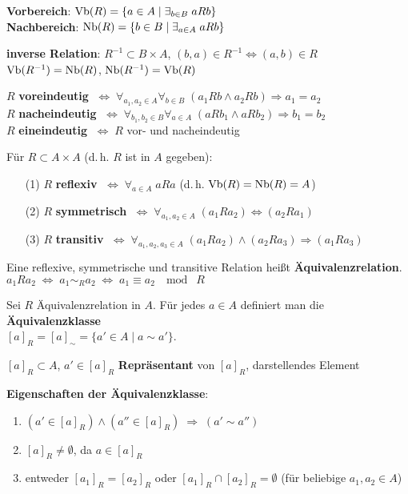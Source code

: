 \textbf{Vorbereich}:
$\operatorname{Vb}(R) = \{a \in A \;|\; \exists_{b \in B}\; a R b\}$ \\
\textbf{Nachbereich}:
$\operatorname{Nb}(R) = \{b \in B \;|\; \exists_{a \in A}\; a R b\}$

\textbf{inverse Relation}: $R^{-1} \subset B \times A$,
$(b,a) \in R^{-1} \Leftrightarrow (a,b) \in R$ \\
$\operatorname{Vb}(R^{-1}) = \operatorname{Nb}(R)$, $\operatorname{Nb}(R^{-1}) = \operatorname{Vb}(R)$

$R$ \textbf{voreindeutig}
$\;\Leftrightarrow\; \forall_{a_1,a_2 \in A} \forall_{b \in B}\;
(a_1 R b \land a_2 R b) \Rightarrow a_1 = a_2$ \\
$R$ \textbf{nacheindeutig}
$\;\Leftrightarrow\; \forall_{b_1,b_2 \in B} \forall_{a \in A}\;
(a R b_1 \land a R b_2) \Rightarrow b_1 = b_2$ \\
$R$ \textbf{eineindeutig} $\;\Leftrightarrow\; R$
vor- und nacheindeutig

\linie

Für $R \subset A \times A$ (d.\,h. $R$ ist in $A$ gegeben):

\begin{itemize}
    \item[(1)] $R$ \textbf{reflexiv} $\;\Leftrightarrow\;
    \forall_{a \in A}\; a R a$ (d.\,h. $\operatorname{Vb}(R) = \operatorname{Nb}(R) = A$)
    
    \item[(2)] $R$ \textbf{symmetrisch} $\;\Leftrightarrow\;
    \forall_{a_1,a_2 \in A}\; (a_1 R a_2) \Leftrightarrow (a_2 R a_1)$
    
    \item[(3)] $R$ \textbf{transitiv} $\;\Leftrightarrow\;
    \forall_{a_1,a_2,a_3 \in A}\;
    (a_1 R a_2) \land (a_2 R a_3) \Rightarrow (a_1 R a_3)$
\end{itemize}

Eine reflexive, symmetrische und transitive Relation heißt
\textbf{Äquivalenzrelation}. \\
$a_1 R a_2 \;\Leftrightarrow\; a_1 \sim_R a_2 \;\Leftrightarrow\;
a_1 \equiv a_2 \; \mod \; R$

Sei $R$ Äquivalenzrelation in $A$. Für jedes $a \in A$ definiert man die
\textbf{Äquivalenzklasse} \\
$[a]_R = [a]_\sim = \{a' \in A \;|\; a \sim a'\}$.

$[a]_R \subset A$, $a' \in [a]_R$ \textbf{Repräsentant} von $[a]_R$,
darstellendes Element

\textbf{Eigenschaften der Äquivalenzklasse}:

\begin{enumerate}
    \item $(a' \in [a]_R) \land (a'' \in [a]_R) \;\Rightarrow\; (a' \sim a'')$
    
    \item $[a]_R \not= \emptyset$, da $a \in [a]_R$
    
    \item entweder $[a_1]_R = [a_2]_R$ oder $[a_1]_R \cap [a_2]_R = \emptyset$
    (für beliebige $a_1, a_2 \in A$)
\end{enumerate}

